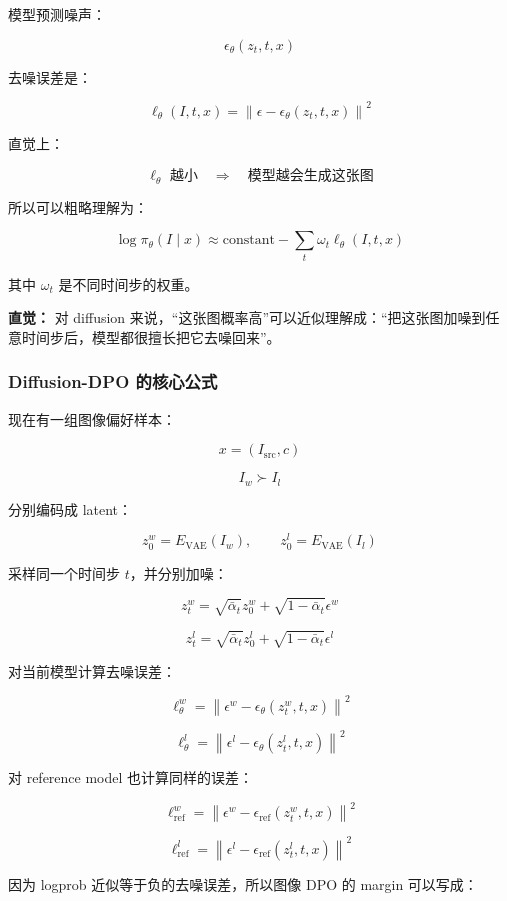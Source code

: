 模型预测噪声：

\[
\epsilon_\theta(z_t,t,x)
\]

去噪误差是：

\[
\ell_\theta(I,t,x)
=
\left\|
\epsilon
-
\epsilon_\theta(z_t,t,x)
\right\|^2
\]

直觉上：

\[
\ell_\theta \text{ 越小}
\quad\Rightarrow\quad
\text{模型越会生成这张图}
\]

所以可以粗略理解为：

\[
\log \pi_\theta(I\mid x)
\approx
\text{constant}
-
\sum_t
\omega_t
\ell_\theta(I,t,x)
\]

其中 $\omega_t$ 是不同时间步的权重。

\begin{intubox}
\textbf{直觉：} 对 diffusion 来说，“这张图概率高”可以近似理解成：“把这张图加噪到任意时间步后，模型都很擅长把它去噪回来”。
\end{intubox}

\subsubsection{Diffusion-DPO 的核心公式}

现在有一组图像偏好样本：

\[
x=(I_\text{src},c)
\]

\[
I_w \succ I_l
\]

分别编码成 latent：

\[
z_0^w=E_\text{VAE}(I_w),
\qquad
z_0^l=E_\text{VAE}(I_l)
\]

采样同一个时间步 $t$，并分别加噪：

\[
z_t^w
=
\sqrt{\bar{\alpha}_t}z_0^w
+
\sqrt{1-\bar{\alpha}_t}\epsilon^w
\]

\[
z_t^l
=
\sqrt{\bar{\alpha}_t}z_0^l
+
\sqrt{1-\bar{\alpha}_t}\epsilon^l
\]

对当前模型计算去噪误差：

\[
\ell_\theta^w
=
\left\|
\epsilon^w
-
\epsilon_\theta(z_t^w,t,x)
\right\|^2
\]

\[
\ell_\theta^l
=
\left\|
\epsilon^l
-
\epsilon_\theta(z_t^l,t,x)
\right\|^2
\]

对 reference model 也计算同样的误差：

\[
\ell_\text{ref}^w
=
\left\|
\epsilon^w
-
\epsilon_\text{ref}(z_t^w,t,x)
\right\|^2
\]

\[
\ell_\text{ref}^l
=
\left\|
\epsilon^l
-
\epsilon_\text{ref}(z_t^l,t,x)
\right\|^2
\]

因为 logprob 近似等于负的去噪误差，所以图像 DPO 的 margin 可以写成：

